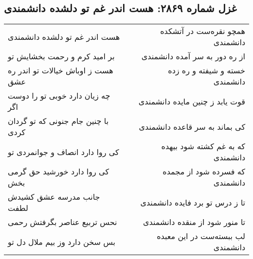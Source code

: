 \begin{center}
\section*{غزل شماره ۲۸۶۹: هست اندر غم تو دلشده دانشمندی}
\label{sec:2869}
\begin{longtable}{l p{0.5cm} r}
هست اندر غم تو دلشده دانشمندی
&&
همچو نقره‌ست در آتشکده دانشمندی
\\
بر امید کرم و رحمت بخشایش تو
&&
از ره دور به سر آمده دانشمندی
\\
هست ز اوباش خیالات تو اندر ره عشق
&&
خسته و شیفته و ره زده دانشمندی
\\
چه زیان دارد خوبی تو را دوست اگر
&&
قوت یابد ز چنین مایده دانشمندی
\\
با چنین جام جنونی که تو گردان کردی
&&
کی بماند به سر قاعده دانشمندی
\\
کی روا دارد انصاف و جوانمردی تو
&&
که به غم کشته شود بیهده دانشمندی
\\
کی روا دارد خورشید حق گرمی بخش
&&
که فسرده شود از مجمده دانشمندی
\\
جانب مدرسه عشق کشیدش لطفت
&&
تا ز درس تو برد فایده دانشمندی
\\
نحس تربیع عناصر بگرفتش رحمی
&&
تا منور شود از منقده دانشمندی
\\
بس سخن دارد وز بیم ملال دل تو
&&
لب ببسته‌ست در این معبده دانشمندی
\\
\end{longtable}
\end{center}
